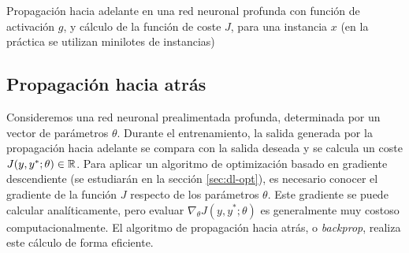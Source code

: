 \begin{algorithm}
\caption{Propagación hacia adelante en una red neuronal profunda con función de activación $g$, y cálculo de la función de coste $J$, para una instancia $x$ (en la práctica se utilizan minilotes de instancias)}
\label{alg:fwdprop}
\begin{algorithmic}
  \ENDFOR
\end{algorithmic}
\end{algorithm}

\subsection{Propagación hacia
atrás}\label{propagaciuxf3n-hacia-atruxe1s}

Consideremos una red neuronal prealimentada profunda, determinada por un
vector de parámetros \(\theta\). Durante el entrenamiento, la salida
generada por la propagación hacia adelante se compara con la salida
deseada y se calcula un coste \(J(y,y^{*};\theta)\in\mathbb{R}\). Para aplicar
un algoritmo de optimización basado en gradiente descendiente (se
estudiarán en la sección \ref{sec:dl-opt}), es necesario conocer el
gradiente de la función \(J\) respecto de los parámetros \(\theta\).
Este gradiente se puede calcular analíticamente, pero evaluar
\(\nabla_{\theta} J(y,y^{*};\theta)\) es generalmente muy costoso
computacionalmente. El algoritmo de propagación hacia atrás, o
\emph{backprop}, realiza este cálculo de forma eficiente.

